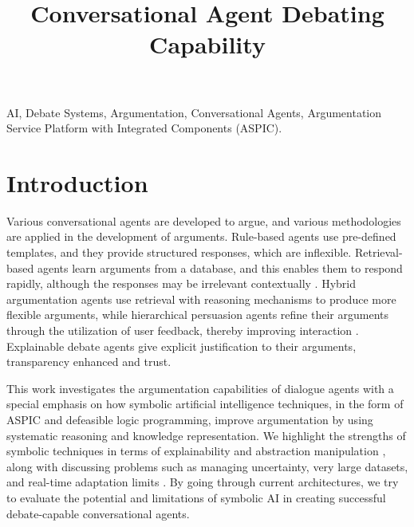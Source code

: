 \documentclass[conference]{IEEEtran}
\begin{document}
\title{Conversational Agent Debating Capability}

\author{
\and
{}
}

\maketitle

\begin{abstract}

\end{abstract}

\begin{IEEEkeywords}
AI, Debate Systems, Argumentation, Conversational Agents, Argumentation Service Platform with Integrated Components (ASPIC).
\end{IEEEkeywords}

\section{Introduction}
Various conversational agents are developed to argue, and various methodologies are applied in the development of arguments. Rule-based agents use pre-defined templates, and they provide structured responses, which are inflexible. Retrieval-based agents learn arguments from a database, and this enables them to respond rapidly, although the responses may be irrelevant contextually \cite{b3}. Hybrid argumentation agents use retrieval with reasoning mechanisms to produce more flexible arguments, while hierarchical persuasion agents refine their arguments through the utilization of user feedback, thereby improving interaction \cite{b5}. Explainable debate agents give explicit justification to their arguments, transparency enhanced and trust.

This work investigates the argumentation capabilities of dialogue agents with a special emphasis on how symbolic artificial intelligence techniques, in the form of ASPIC and defeasible logic programming, improve argumentation by using systematic reasoning and knowledge representation. We highlight the strengths of symbolic techniques in terms of explainability and abstraction manipulation \cite{b8}, along with discussing problems such as managing uncertainty, very large datasets, and real-time adaptation limits \cite{b10}. By going through current architectures, we try to evaluate the potential and limitations of symbolic AI in creating successful debate-capable conversational agents.
\end{document}
